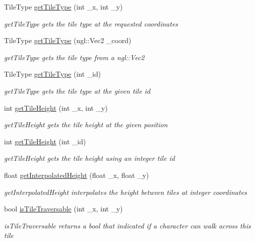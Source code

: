 \begin{DoxyCompactItemize}
\item 
Tile\+Type \hyperlink{class_grid_a92c51a87c9693b764c39baba06e7a163}{get\+Tile\+Type} (int \+\_\+x, int \+\_\+y)
\begin{DoxyCompactList}\small\item\em get\+Tile\+Type gets the tile type at the requested coordinates \end{DoxyCompactList}\item 
Tile\+Type \hyperlink{class_grid_ada5f2b20c1addc6427858440e10fc0f7}{get\+Tile\+Type} (ngl\+::\+Vec2 \+\_\+coord)
\begin{DoxyCompactList}\small\item\em get\+Tile\+Type gets the tile type from a ngl\+::\+Vec2 \end{DoxyCompactList}\item 
Tile\+Type \hyperlink{class_grid_a30afc3618fcf00a6d4684679ce8ef4ca}{get\+Tile\+Type} (int \+\_\+id)
\begin{DoxyCompactList}\small\item\em get\+Tile\+Type gets the tile type at the given tile id \end{DoxyCompactList}\item 
int \hyperlink{class_grid_a1b5974e4c82ad6524e893b137961ff51}{get\+Tile\+Height} (int \+\_\+x, int \+\_\+y)
\begin{DoxyCompactList}\small\item\em get\+Tile\+Height gets the tile height at the given position \end{DoxyCompactList}\item 
int \hyperlink{class_grid_a5f18d590b116be8e0ea88b10e91dd4bd}{get\+Tile\+Height} (int \+\_\+id)
\begin{DoxyCompactList}\small\item\em get\+Tile\+Height gets the tile height using an integer tile id \end{DoxyCompactList}\item 
float \hyperlink{class_grid_af228e1b51546bcf3ca7e4266a9fb1b74}{get\+Interpolated\+Height} (float \+\_\+x, float \+\_\+y)
\begin{DoxyCompactList}\small\item\em get\+Interpolated\+Height interpolates the height between tiles at integer coordinates \end{DoxyCompactList}\item 
bool \hyperlink{class_grid_a9e679439e6905cb81d5809cb1f9cd5ea}{is\+Tile\+Traversable} (int \+\_\+x, int \+\_\+y)
\begin{DoxyCompactList}\small\item\em is\+Tile\+Traversable returns a bool that indicated if a character can walk across this tile \end{DoxyCompactList}\item 

\end{DoxyCompactItemize}
